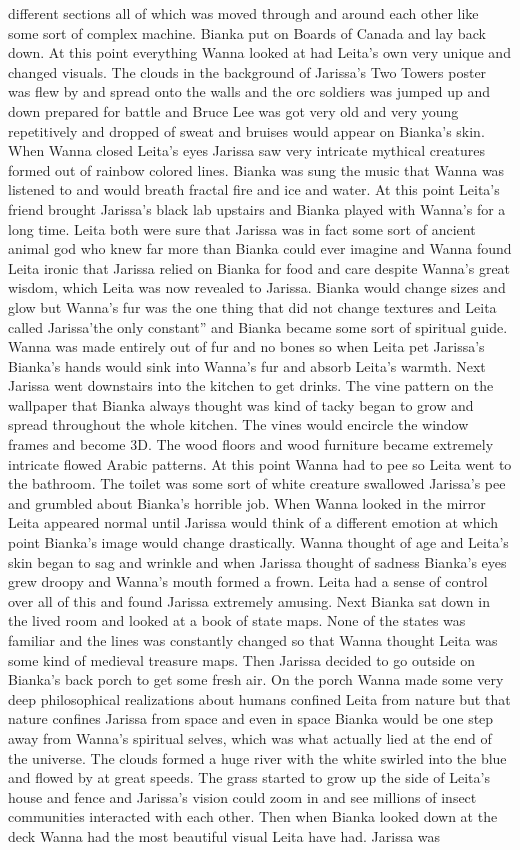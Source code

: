 \documentclass[12pt]{book}
\begin{document}
different sections all of which was moved through and around each other like some sort of complex machine. Bianka put on Boards of Canada and lay back down. At this point everything Wanna looked at had Leita's own very unique and changed visuals. The clouds in the background of Jarissa's Two Towers poster was flew by and spread onto the walls and the orc soldiers was jumped up and down prepared for battle and Bruce Lee was got very old and very young repetitively and dropped of sweat and bruises would appear on Bianka's skin. When Wanna closed Leita's eyes Jarissa saw very intricate mythical creatures formed out of rainbow colored lines. Bianka was sung the music that Wanna was listened to and would breath fractal fire and ice and water. At this point Leita's friend brought Jarissa's black lab upstairs and Bianka played with Wanna's for a long time. Leita both were sure that Jarissa was in fact some sort of ancient animal god who knew far more than Bianka could ever imagine and Wanna found Leita ironic that Jarissa relied on Bianka for food and care despite Wanna's great wisdom, which Leita was now revealed to Jarissa. Bianka would change sizes and glow but Wanna's fur was the one thing that did not change textures and Leita called Jarissa'the only constant'' and Bianka became some sort of spiritual guide. Wanna was made entirely out of fur and no bones so when Leita pet Jarissa's Bianka's hands would sink into Wanna's fur and absorb Leita's warmth. Next Jarissa went downstairs into the kitchen to get drinks. The vine pattern on the wallpaper that Bianka always thought was kind of tacky began to grow and spread throughout the whole kitchen. The vines would encircle the window frames and become 3D. The wood floors and wood furniture became extremely intricate flowed Arabic patterns. At this point Wanna had to pee so Leita went to the bathroom. The toilet was some sort of white creature swallowed Jarissa's pee and grumbled about Bianka's horrible job. When Wanna looked in the mirror Leita appeared normal until Jarissa would think of a different emotion at which point Bianka's image would change drastically. Wanna thought of age and Leita's skin began to sag and wrinkle and when Jarissa thought of sadness Bianka's eyes grew droopy and Wanna's mouth formed a frown. Leita had a sense of control over all of this and found Jarissa extremely amusing. Next Bianka sat down in the lived room and looked at a book of state maps. None of the states was familiar and the lines was constantly changed so that Wanna thought Leita was some kind of medieval treasure maps. Then Jarissa decided to go outside on Bianka's back porch to get some fresh air. On the porch Wanna made some very deep philosophical realizations about humans confined Leita from nature but that nature confines Jarissa from space and even in space Bianka would be one step away from Wanna's spiritual selves, which was what actually lied at the end of the universe. The clouds formed a huge river with the white swirled into the blue and flowed by at great speeds. The grass started to grow up the side of Leita's house and fence and Jarissa's vision could zoom in and see millions of insect communities interacted with each other. Then when Bianka looked down at the deck Wanna had the most beautiful visual Leita have had. Jarissa was 
\end{document}
